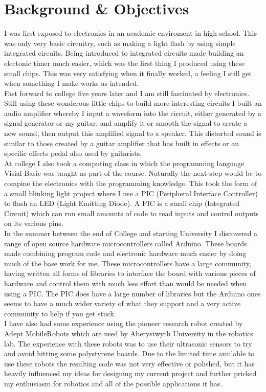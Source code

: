 \chapter{Background \& Objectives}

I was first exposed to electronics in an academic enviroment in high school.  This was only very basic circuitry, such as making a light flash by using simple integrated circuits.  Being introduced to integrated circuits made building an electonic timer much easier, which was the first thing I produced using these small chips.  This was very satisfying when it finally worked, a feeling I still get when something I make works as intended.
\\Fast forward to college five years later and I am still fascinated by electronics.  Still using these wonderous little chips to build more interesting circuits I built an audio amplifier whereby I input a waveform into the circuit, either generated by a signal generator or my guitar, and amplify it or smooth the signal to create a new sound, then output this amplified signal to a speaker.  This distorted sound is similar to those created by a guitar amplifier that has built in effects or an specific effects pedal also used by guitarists.
\\At college I also took a computing class in which the programming language Visial Basic was taught as part of the course.  Naturally the next step would be to compine the electronics with the programming knowledge.  This took the form of a small blinking light project where I use a PIC (Peripheral Interface Controller) to flash an LED (Light Emitting Diode).  A PIC is a small chip (Integrated Circuit) which can run small amounts of code to read inputs and control outputs on its various pins.
\\In the summer between the end of College and starting University I discovered a range of open source hardware microcontrollers called Arduino.  These boards made combining program code and electronic hardware much easier by doing much of the base work for me.  These microcontrollers have a large community, having written all forms of libraries to interface the board with various pieces of hardware and control them with much less effort than would be needed when using a PIC.  The PIC does have a large number of libraries but the Arduino ones seems to have a much wider variety of what they support and a very active community to help if you get stuck.
\\I have also had some experience using the pioneer research robot created by Adept MobileRobots \cite{mobilerobots} which are used by Aberystwyth University in the robotics lab.  The experience with these robots was to use their ultrasonic sensors to try and avoid hitting some polystyrene boards.  Due to the limited time available to use these robots the resulting code was not very effective or polished, but it has heavily influenced my ideas for designing my current project and further pricked my enthusiasm for robotics and all of the possible applications it has.
